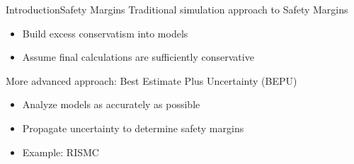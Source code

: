 \documentclass{beamer}
\begin{document}
\begin{frame}{Introduction}{Safety Margins}\vspace{-10pt}
  Traditional simulation approach to Safety Margins
  \vfill
  \begin{itemize}
    \item Build excess conservatism into models
    \item Assume final calculations are sufficiently conservative
  \end{itemize}
  \vfill
  More advanced approach: Best Estimate Plus Uncertainty (BEPU)
  \vfill
  \begin{itemize}
    \item Analyze models as accurately as possible
    \item Propagate uncertainty to determine safety margins
    \item Example: RISMC
  \end{itemize}
  \vfill
\end{frame}
\end{document}
